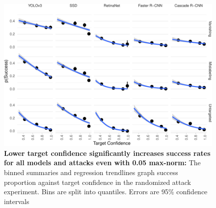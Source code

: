 \begin{figure}[tb]

{\centering \includegraphics{imgs/target_conf_graph-1} 

}

\caption{\textbf{Lower target confidence significantly increases success rates for all models and attacks even with 0.05 max-norm:}  The binned summaries and regression trendlines graph success proportion against target confidence in the randomized attack experiment. Bins are split into quantiles. Errors are 95\% confidence intervals}\label{fig:target_conf_graph}
\end{figure}

\begingroup\fontsize{9}{11}\selectfont

